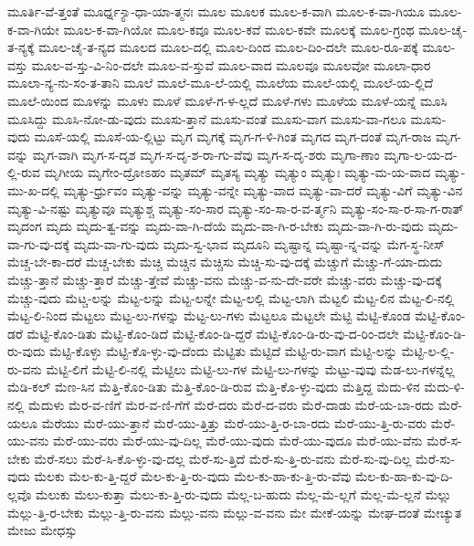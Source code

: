 {ಮೂರ್ತಿ-ವೆ-ತ್ತಂತೆ
ಮೂರ್ಧ್ನ-್ಯಾ-ಧಾ-ಯಾ-ತ್ಮನಃ
ಮೂಲ
ಮೂಲಕ
ಮೂಲ-ಕ-ವಾಗಿ
ಮೂಲ-ಕ-ವಾ-ಗಿಯೂ
ಮೂಲ-ಕ-ವಾ-ಗಿಯೇ
ಮೂಲ-ಕ-ವಾ-ಗಿಯೋ
ಮೂಲ-ಕವೂ
ಮೂಲ-ಕವೆ
ಮೂಲ-ಕವೇ
ಮೂಲಕ್ಕೆ
ಮೂಲ-ಗ್ರಂಥ
ಮೂಲ-ಚೈ-ತ-ನ್ಯಕ್ಕೆ
ಮೂಲ-ಚೈ-ತ-ನ್ಯದ
ಮೂಲದ
ಮೂಲ-ದಲ್ಲಿ
ಮೂಲ-ದಿಂದ
ಮೂಲ-ದಿಂ-ದಲೇ
ಮೂಲ-ರೂ-ಪಕ್ಕೆ
ಮೂಲ-ವಸ್ತು
ಮೂಲ-ವ-ಸ್ತು-ವಿ-ನಿಂ-ದಲೇ
ಮೂಲ-ವ-ಸ್ತುವೆ
ಮೂಲ-ವಾದ
ಮೂಲವೂ
ಮೂಲವೋ
ಮೂಲಾ-ಧಾರ
ಮೂಲಾ-ನ್ಯ-ನು-ಸಂ-ತ-ತಾನಿ
ಮೂಲೆ
ಮೂಲೆ-ಮೂ-ಲೆ-ಯಲ್ಲಿ
ಮೂಲೆಯ
ಮೂಲೆ-ಯಲ್ಲಿ
ಮೂಲೆ-ಯ-ಲ್ಲಿದೆ
ಮೂಲೆ-ಯಿಂದ
ಮೂಳನ್ನು
ಮೂಳು
ಮೂಳೆ
ಮೂಳೆ-ಗ-ಳ-ಲ್ಲದೆ
ಮೂಳೆ-ಗಳು
ಮೂಳೆಯ
ಮೂಳೆ-ಯನ್ನೆ
ಮೂಸಿ
ಮೂಸಿದ್ದು
ಮೂಸಿ-ನೋ-ಡು-ವುದು
ಮೂಸು-ತ್ತಾನೆ
ಮೂಸು-ವಂತೆ
ಮೂಸು-ವಾಗ
ಮೂಸು-ವಾ-ಗಲೂ
ಮೂಸು-ವುದು
ಮೂಸೆ-ಯಲ್ಲಿ
ಮೂಸೆ-ಯ-ಲ್ಲಿಟ್ಟು
ಮೃಗ
ಮೃಗಕ್ಕೆ
ಮೃಗ-ಗ-ಳಿ-ಗಿಂತ
ಮೃಗದ
ಮೃಗ-ದಂತೆ
ಮೃಗ-ರಾಜ
ಮೃಗ-ವನ್ನು
ಮೃಗ-ವಾಗಿ
ಮೃಗ-ಸ-ದೃಶ
ಮೃಗ-ಸ-ದೃ-ಶ-ರಾ-ಗು-ವೆವು
ಮೃಗ-ಸ-ದೃ-ಶರು
ಮೃಗಾ-ಣಾಂ
ಮೃಗಾ-ಲ-ಯ-ದ-ಲ್ಲಿ-ರುವ
ಮೃಗೀಯ
ಮೃಗೇಂ-ದ್ರೋಽಹಂ
ಮೃತಮ್
ಮೃತಸ್ಯ
ಮೃತ್ಯು
ಮೃತ್ಯುಂ
ಮೃತ್ಯುಃ
ಮೃತ್ಯು-ಮ-ಯ-ವಾದ
ಮೃತ್ಯು-ಮು-ಖ-ದಲ್ಲಿ
ಮೃತ್ಯು-ರ್ಧ್ರುವಂ
ಮೃತ್ಯು-ವನ್ನು
ಮೃತ್ಯು-ವನ್ನೇ
ಮೃತ್ಯು-ವಾದ
ಮೃತ್ಯು-ವಾ-ದರೆ
ಮೃತ್ಯು-ವಿಗೆ
ಮೃತ್ಯು-ವಿನ
ಮೃತ್ಯು-ವಿ-ನಷ್ಟು
ಮೃತ್ಯುವೂ
ಮೃತ್ಯುಶ್ಚ
ಮೃತ್ಯು-ಸಂ-ಸಾರ
ಮೃತ್ಯು-ಸಂ-ಸಾ-ರ-ವ-ರ್ತ್ಮನಿ
ಮೃತ್ಯು-ಸಂ-ಸಾ-ರ-ಸಾ-ಗ-ರಾತ್
ಮೃದಂಗ
ಮೃದು
ಮೃದು-ತ್ವ-ವನ್ನು
ಮೃದು-ವಾ-ಗಿ-ದೆಯೆ
ಮೃದು-ವಾ-ಗಿ-ರ-ಬೇಕು
ಮೃದು-ವಾ-ಗಿ-ರು-ವುದು
ಮೃದು-ವಾ-ಗು-ವು-ದಕ್ಕೆ
ಮೃದು-ವಾ-ಗು-ವುದು
ಮೃದು-ಸ್ವ-ಭಾವ
ಮೃದೂನಿ
ಮೃಷ್ಟಾನ್ನ
ಮೃಷ್ಟಾ-ನ್ನ-ವನ್ನು
ಮೆಗ-ಸ್ಥ-ನೀಸ್
ಮೆಚ್ಚ-ಬೇ-ಕಾ-ದರೆ
ಮೆಚ್ಚ-ಬೇಕು
ಮೆಚ್ಚಿ
ಮೆಚ್ಚಿನ
ಮೆಚ್ಚಿಸು
ಮೆಚ್ಚಿ-ಸು-ವು-ದಕ್ಕೆ
ಮೆಚ್ಚುಗೆ
ಮೆಚ್ಚು-ಗೆ-ಯಾ-ದುದು
ಮೆಚ್ಚು-ತ್ತಾನೆ
ಮೆಚ್ಚು-ತ್ತಾರೆ
ಮೆಚ್ಚು-ತ್ತೇವೆ
ಮೆಚ್ಚು-ವನು
ಮೆಚ್ಚು-ವ-ನು-ದೇ-ವರೇ
ಮೆಚ್ಚು-ವರು
ಮೆಚ್ಚು-ವು-ದಕ್ಕೆ
ಮೆಚ್ಚು-ವುದು
ಮೆಟ್ಚ-ಲನ್ನು
ಮೆಟ್ಟ-ಲನ್ನು
ಮೆಟ್ಟ-ಲನ್ನೇ
ಮೆಟ್ಟ-ಲಲ್ಲಿ
ಮೆಟ್ಟ-ಲಾಗಿ
ಮೆಟ್ಟಲಿ
ಮೆಟ್ಟ-ಲಿನ
ಮೆಟ್ಟ-ಲಿ-ನಲ್ಲಿ
ಮೆಟ್ಟ-ಲಿ-ನಿಂದ
ಮೆಟ್ಟಲು
ಮೆಟ್ಟ-ಲು-ಗಳನ್ನು
ಮೆಟ್ಟ-ಲು-ಗಳು
ಮೆಟ್ಟಲೂ
ಮೆಟ್ಟಲೇ
ಮೆಟ್ಟಿ
ಮೆಟ್ಟಿ-ಕೊಂಡ
ಮೆಟ್ಟಿ-ಕೊಂ-ಡರೆ
ಮೆಟ್ಟಿ-ಕೊಂ-ಡಿತು
ಮೆಟ್ಟಿ-ಕೊಂ-ಡಿದೆ
ಮೆಟ್ಟಿ-ಕೊಂ-ಡಿ-ದ್ದರೆ
ಮೆಟ್ಟಿ-ಕೊಂ-ಡಿ-ರು-ವು-ದ-ರಿಂ-ದಲೇ
ಮೆಟ್ಟಿ-ಕೊಂ-ಡಿ-ರು-ವುದು
ಮೆಟ್ಟಿ-ಕೊಳ್ಳು
ಮೆಟ್ಟಿ-ಕೊ-ಳ್ಳು-ವು-ದೆಂದು
ಮೆಟ್ಟಿತು
ಮೆಟ್ಟಿದೆ
ಮೆಟ್ಟಿ-ರು-ವಾಗ
ಮೆಟ್ಟಿ-ಲನ್ನು
ಮೆಟ್ಟಿ-ಲ-ಲ್ಲಿ-ರು-ವನು
ಮೆಟ್ಟಿ-ಲಿಗೆ
ಮೆಟ್ಟಿ-ಲಿ-ನಲ್ಲಿ
ಮೆಟ್ಟಿಲು
ಮೆಟ್ಟಿ-ಲು-ಗಳ
ಮೆಟ್ಟಿ-ಲು-ಗಳನ್ನು
ಮೆಟ್ಟು-ವುವು
ಮೆಡ-ಲು-ಗಳನ್ನೆಲ್ಲ
ಮೆಡಿ-ಕಲ್
ಮೆಣ-ಸಿನ
ಮೆತ್ತಿ-ಕೊಂ-ಡಿತು
ಮೆತ್ತಿ-ಕೊಂ-ಡಿ-ರುವ
ಮೆತ್ತಿ-ಕೊ-ಳ್ಳು-ವುದು
ಮೆತ್ತಿದ್ದ
ಮೆದು-ಳಿನ
ಮೆದು-ಳಿ-ನಲ್ಲಿ
ಮೆದುಳು
ಮೆರ-ವ-ಣಿಗೆ
ಮೆರ-ವ-ಣಿ-ಗೆಗೆ
ಮೆರೆ-ದರು
ಮೆರೆ-ದ-ವರು
ಮೆರೆ-ದಾಡು
ಮೆರೆ-ಯ-ಬಾ-ರದು
ಮೆರೆ-ಯಲೂ
ಮೆರೆಯು
ಮೆರೆ-ಯು-ತ್ತಾನೆ
ಮೆರೆ-ಯು-ತ್ತಿತ್ತು
ಮೆರೆ-ಯು-ತ್ತಿ-ರ-ಬಾ-ರದು
ಮೆರೆ-ಯು-ತ್ತಿ-ರು-ವರು
ಮೆರೆ-ಯು-ವನು
ಮೆರೆ-ಯು-ವರು
ಮೆರೆ-ಯು-ವು-ದಿಲ್ಲ
ಮೆರೆ-ಯು-ವುದು
ಮೆರೆ-ಯು-ವುದೂ
ಮೆರೆ-ಯು-ವೆನು
ಮೆರೆ-ಸ-ಬೇಕು
ಮೆರೆ-ಸಲು
ಮೆರೆ-ಸಿ-ಕೊ-ಳ್ಳು-ವು-ದಲ್ಲ
ಮೆರೆ-ಸು-ತ್ತಿದೆ
ಮೆರೆ-ಸು-ತ್ತಿ-ರು-ವನು
ಮೆರೆ-ಸು-ವು-ದಿಲ್ಲ
ಮೆರೆ-ಸು-ವುದು
ಮೆಲಕು
ಮೆಲ-ಕು-ತ್ತಿ-ದ್ದರೆ
ಮೆಲ-ಕು-ತ್ತಿ-ರು-ವುದು
ಮೆಲ-ಕು-ಹಾ-ಕು-ತ್ತಿ-ರು-ವೆವು
ಮೆಲ-ಕು-ಹಾ-ಕು-ವು-ದಿ-ಲ್ಲವೊ
ಮೆಲುಕು
ಮೆಲು-ಕುತ್ತಾ
ಮೆಲು-ಕು-ತ್ತಿ-ರು-ವುದು
ಮೆಲ್ಲ-ಬ-ಹುದು
ಮೆಲ್ಲ-ಮೆ-ಲ್ಲಗೆ
ಮೆಲ್ಲ-ಮೆ-ಲ್ಲನೆ
ಮೆಲ್ಲು
ಮೆಲ್ಲು-ತ್ತಿ-ರ-ಬೇಕು
ಮೆಲ್ಲು-ತ್ತಿ-ರು-ವನು
ಮೆಲ್ಲು-ವನು
ಮೆಲ್ಲು-ವ-ವನು
ಮೇ
ಮೇಕೆ-ಯನ್ನು
ಮೇಘ-ದಂತೆ
ಮೇಚ್ಯುತ
ಮೇಜು
ಮೇಧಸ್ಸು
}
